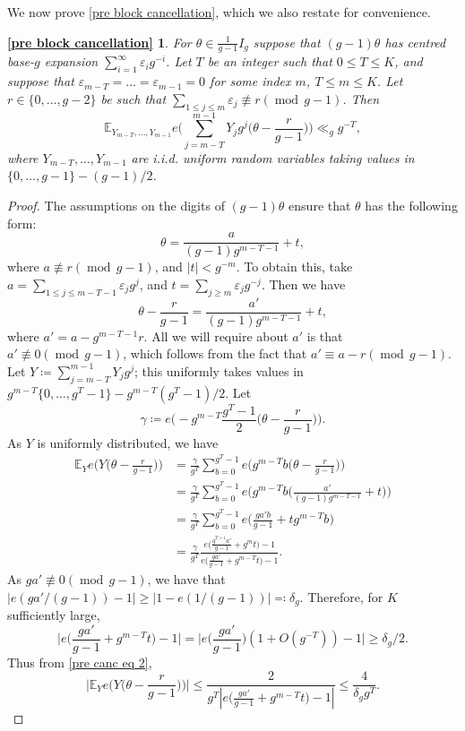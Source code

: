 \documentclass[hidelinks,11pt,reqno]{amsart}
\renewcommand{\leq}{\leqslant}
\renewcommand{\geq}{\geqslant}
\newcommand{\E}{\ensuremath{\mathbb{E}}}
\newcommand{\nequiv}{\not\equiv}
\newtheorem*{pre-canc-rpt}{\cref{pre block cancellation}}
\theoremstyle{remark}
\newcommand{\md}[1]{\ensuremath{(\operatorname{mod}\, #1)}}
\begin{document}
We now prove \cref{pre block cancellation}, which we also restate for convenience.
\begin{pre-canc-rpt}
For $\theta\in \tfrac{1}{g-1}I_{g}$ suppose that $(g-1)\theta$ has centred base-$g$ expansion $\sum_{i=1}^{\infty}\varepsilon_{i}g^{-i}$. Let $T$ be an integer such that $0\leq T\leq K$, and suppose that $\varepsilon_{m-T}=\ldots=\varepsilon_{m-1}=0$ for some index $m$, $T\leq m\leq K$. Let $r\in \{0,\ldots, g-2\}$ be such that $\sum_{1\leq j \leq m}\varepsilon_{j}\nequiv r\md{g-1}$. Then
\[\E_{Y_{m-T},\ldots, Y_{m-1}}e\Big (\sum_{j=m-T}^{m-1}Y_{j}g^{j}\Big(\theta-\frac{r}{g-1}\Big)\Big)\ll_{g} g^{-T},\]
where $Y_{m-T},\ldots, Y_{m-1}$ are i.i.d. uniform random variables taking values in $\{0,\ldots, g-1\}-(g-1)/2$.
\end{pre-canc-rpt}
\begin{proof}
    The assumptions on the digits of $(g-1)\theta$ ensure that $\theta$ has the following form:
    \[\theta=\frac{a}{(g-1)g^{m-T -1}}+t,\]
    where $a\nequiv r\md{g-1}$, and $|t|<g^{-m}$. To obtain this, take $a=\sum_{1\leq j\leq m-T -1}\varepsilon_{j}g^{j}$, and $t=\sum_{j\geq m}\varepsilon_{j}g^{-j}$. Then we have
    \begin{equation}\label{pre canc structure theta}
        \theta-\frac{r}{g-1}=\frac{a'}{(g-1)g^{m-T -1}}+t,
    \end{equation}
    where $a'=a-g^{m-T-1}r$. All we will require about $a'$ is that $a'\nequiv 0 \md{g-1}$, which follows from the fact that $a'\equiv a-r\md{g-1}$. 
    Let $Y\coloneq \sum_{j=m-T}^{m-1}Y_{j}g^{j}$; this uniformly takes values in $g^{m-T}\{0,\ldots, g^{T}-1\}-g^{m-T}(g^{T}-1)/2$. 
    Let
    \[\gamma \coloneq e\Big (-g^{m-T}\frac{g^{T}-1}{2}\Big (\theta-\frac{r}{g-1}\Big)\Big).\]
 As $Y$ is uniformly distributed, we have
    \begin{align}
        \E_{Y}e\Big (Y\Big (\theta-\frac{r}{g-1}\Big)\Big)&=\frac{\gamma}{g^{T}}\sum_{b=0}^{g^{T}-1}e\Big(g^{m-T}b\Big(\theta-\frac{r}{g-1}\Big )\Big)\nonumber\\
        &=\frac{\gamma}{g^{T}}\sum_{b=0}^{g^{T}-1}e\Big(g^{m-T}b\Big (\frac{a'}{(g-1)g^{m-T-1}}+t\Big )\Big)\nonumber\\
        &=\frac{\gamma}{g^{T}}\sum_{b=0}^{g^{T}-1}e\Big(\frac{ga'b}{g-1}+tg^{m-T}b\Big)\nonumber\\
        &=\frac{\gamma}{g^{T}}\frac{e\big (\frac{g^{T+1}a'}{g-1}+g^{m}t\big)-1}{e\big (\frac{ga'}{g-1}+g^{m-T}t\big)-1}.\label{pre canc eq 2}
    \end{align}
    As $ga'\nequiv 0 \md{g-1}$, we have that $|e(ga'/(g-1))-1|\geq |1-e(1/(g-1))|\eqqcolon \delta_{g}.$ Therefore, for $K$ sufficiently large,
    \[\Big|e\Big (\frac{ga'}{g-1}+g^{m-T}t\Big)-1\Big|=\Big|e\Big (\frac{ga'}{g-1}\Big)(1+O(g^{-T}))-1\Big|\geq \delta_{g}/2.\]
Thus from \cref{pre canc eq 2},
\[\Big |\E_{Y}e\Big(Y\Big (\theta-\frac{r}{g-1}\Big )\Big)\Big | \leq \frac{2}{g^{T}|e\big (\frac{ga'}{g-1}+g^{m-T}t\big)-1|}\leq \frac{4}{\delta_{g}g^{T}}.\]
\end{proof}
\end{document}
